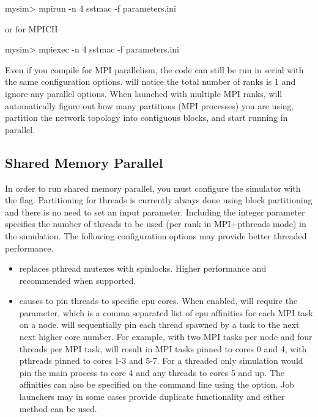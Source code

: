 \begin{ShellCmd}
mysim> mpirun -n 4 sstmac -f parameters.ini
\end{ShellCmd}
or for MPICH

\begin{ShellCmd}
mysim> mpiexec -n 4 sstmac -f parameters.ini
\end{ShellCmd}

Even if you compile for MPI parallelism, the code can still be run in serial with the same configuration options.
\sstmacro will notice the total number of ranks is 1 and ignore any parallel options.
When launched with multiple MPI ranks, \sstmacro will automatically figure out how many partitions (MPI processes) 
you are using, partition the network topology into contiguous blocks, and start running in parallel.   

\subsection{Shared Memory Parallel}
\label{subsec:parallelopt}
In order to run shared memory parallel, you must configure the simulator with the  flag.
Partitioning for threads is currently always done using block partitioning and there is no need to set an input parameter.
Including the integer parameter  specifies the number of threads to be used (per rank in MPI+pthreads mode) in the simulation.
The following configuration options may provide better threaded performance.
\begin{itemize}
\item{} replaces pthread mutexes with spinlocks.  Higher performance and recommended when supported.
\item{} causes \sstmacro to pin threads to specific cpu cores.  When enabled, \sstmacro will require the
 parameter, which is a comma separated list of cpu affinities for each MPI task on a node.  \sstmacro will sequentially
pin each thread spawned by a task to the next next higher core number.  For example, with two MPI tasks per node and four threads per MPI task,
 will result in MPI tasks pinned to cores 0 and 4, with pthreads pinned to cores 1-3 and 5-7.
For a threaded only simulation  would pin the main process to core 4 and any threads to cores 5 and up.
The affinities can also be specified on the command line using the  option.
Job launchers may in some cases provide duplicate functionality and either method can be used.
\end{itemize}

